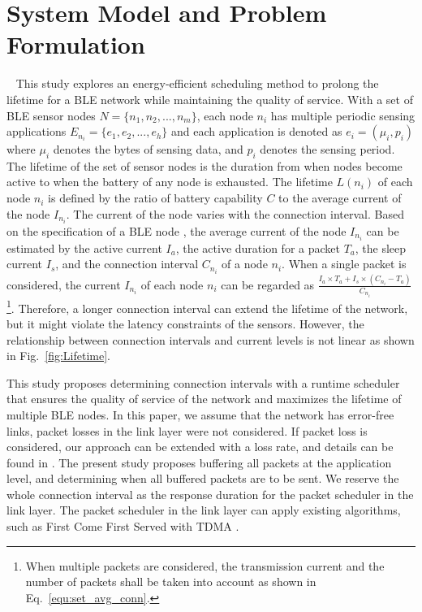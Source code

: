 \documentclass[10pt,journal,compsoc]{IEEEtran}
\begin{document}
\section{System Model and Problem Formulation}~\label{sec:prob}
This study explores an energy-efficient scheduling method to prolong the lifetime for a BLE network while maintaining the quality of service. With a set of BLE sensor nodes $N=\{n_1, n_2, ..., n_m\}$, each node $n_i$ has multiple periodic sensing applications $E_{n_i}=\{e_1, e_2,..., e_h\}$ and each application is denoted as $e_i=(\mu_i, p_i)$ where $\mu_i$ denotes the bytes of sensing data, and $p_i$ denotes the sensing period. The lifetime of the set of sensor nodes is the duration from when nodes become active to when the battery of any node is exhausted. The lifetime $L(n_i)$ of each node $n_i$ is defined by the ratio of battery capability $C$ to the average current of the node $I_{n_i}$. The current of the node varies with the connection interval. Based on the specification of a BLE node \cite{MEASURE_BLE}, the average current of the node $I_{n_i}$ can be estimated by the active current $I_a$, the active duration for a packet $T_{a}$, the sleep current $I_{s}$, and the connection interval $C_{n_i}$ of a node $n_i$. When a single packet is considered, the current $I_{n_i}$ of each node $n_i$ can be regarded as $\frac{I_{a} \times T_{a} +I_{s}\times (C_{n_i}- T_{a})}{C_{n_i}}$ \footnote{When multiple packets are considered, the transmission current and the number of packets shall be taken into account as shown in Eq.~\ref{equ:set_avg_conn}.}.
Therefore, a longer connection interval can extend the lifetime of the network, but it might violate the latency constraints of the sensors.
However, the relationship between connection intervals and current levels is not linear as shown in Fig.~\ref{fig:Lifetime}.

This study proposes determining connection intervals with a runtime scheduler that ensures the quality of service of the network and maximizes the lifetime of multiple BLE nodes. In this paper, we assume that the network has error-free links, packet losses in the link layer were not considered. If packet loss is considered, our approach can be extended with a loss rate, and details can be found in \cite{gomez2011modeling}. The present study proposes buffering all packets at the application level, and determining when all buffered packets are to be sent. We reserve the whole connection interval as the response duration for the packet scheduler in the link layer. The packet scheduler in the link layer can apply existing algorithms, such as First Come First Served with TDMA \cite{paulreview}.
\end{document}
